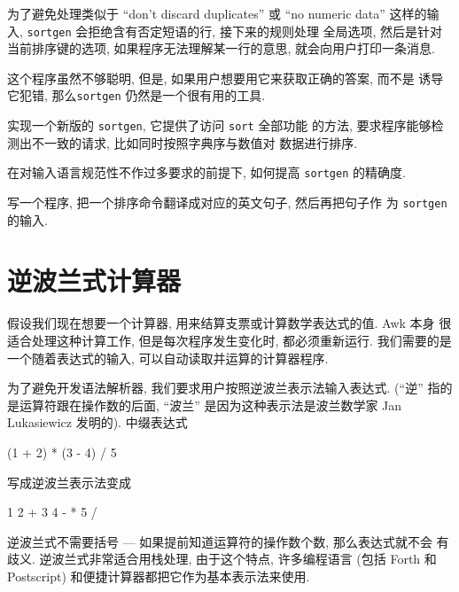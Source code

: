 为了避免处理类似于 ``don't discard duplicates'' 或 ``no numeric data'' 
这样的输入, \texttt{sortgen} 会拒绝含有否定短语的行, 接下来的规则处理
全局选项, 然后是针对当前排序键的选项, 如果程序无法理解某一行的意思,
就会向用户打印一条消息.

这个程序虽然不够聪明, 但是, 如果用户想要用它来获取正确的答案, 而不是
诱导它犯错, 那么\texttt{sortgen} 仍然是一个很有用的工具.

\begin{exercise}
    实现一个新版的 \texttt{sortgen}, 它提供了访问 \texttt{sort} 全部功能
    的方法, 要求程序能够检测出不一致的请求, 比如同时按照字典序与数值对
    数据进行排序.
\end{exercise}

\begin{exercise}
    在对输入语言规范性不作过多要求的前提下, 如何提高 \texttt{sortgen} 
    的精确度.
\end{exercise}

\begin{exercise}
    写一个程序, 把一个排序命令翻译成对应的英文句子, 然后再把句子作
    为 \texttt{sortgen} 的输入.
\end{exercise}

\section{逆波兰式计算器}
\label{sec:a_reverse_polish_calculator}

假设我们现在想要一个计算器, 用来结算支票或计算数学表达式的值. Awk 本身
很适合处理这种计算工作, 但是每次程序发生变化时, 都必须重新运行.
我们需要的是一个随着表达式的输入, 可以自动读取并运算的计算器程序.

为了避免开发语法解析器, 我们要求用户按照逆波兰表示法输入表达式. (``逆''
指的是运算符跟在操作数的后面, ``波兰'' 是因为这种表示法是波兰数学家
Jan Lukasiewicz 发明的). 中缀表达式
\begin{awkcode}
    (1 + 2) * (3 - 4) / 5
\end{awkcode}
写成逆波兰表示法变成
\begin{awkcode}
    1 2 + 3 4 - * 5 /
\end{awkcode}
逆波兰式不需要括号 --- 如果提前知道运算符的操作数个数, 那么表达式就不会
有歧义. 逆波兰式非常适合用栈处理, 由于这个特点, 许多编程语言 (包括
Forth 和 Postscript) 和便捷计算器都把它作为基本表示法来使用.

